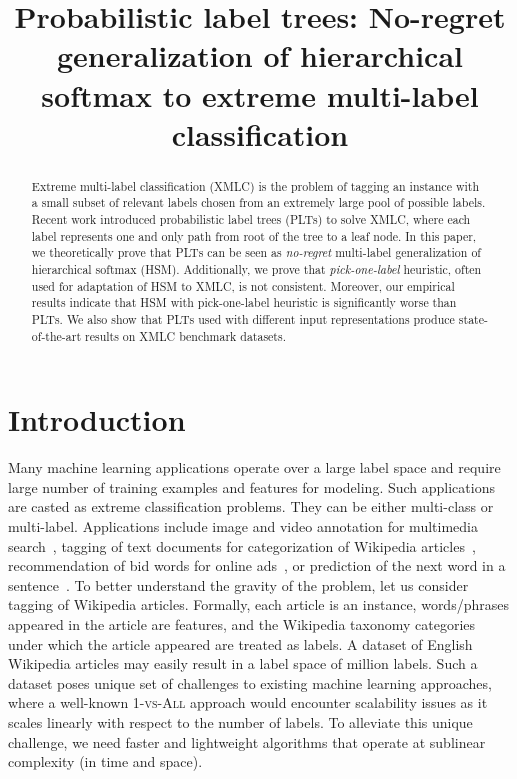 \documentclass{article}
\title{Probabilistic label trees: No-regret generalization of hierarchical softmax to extreme multi-label classification}
\newcommand{\Algo}[1]{\textsc{#1}}
\begin{document}
\maketitle



\begin{abstract}
Extreme multi-label classification (XMLC) is the problem of
tagging an instance with a small subset of relevant labels chosen from an
extremely large pool of possible labels.  
Recent work introduced probabilistic label trees
(\Algo{PLT}s) to solve XMLC, where each label represents one and only 
path from root of the tree to a leaf node.  In this paper, we
theoretically prove that \Algo{PLT}s can be seen as \emph{no-regret}
multi-label generalization of hierarchical softmax
(\Algo{HSM}). Additionally, we prove that \emph{pick-one-label}
heuristic, often used for adaptation of HSM to XMLC, is not consistent. 
Moreover, our
empirical results indicate that \Algo{HSM} with pick-one-label heuristic is
significantly worse than \Algo{PLT}s. We also show that \Algo{PLT}s used with
different input representations produce state-of-the-art results on XMLC benchmark
datasets.

%
\end{abstract}

\section{Introduction}
\label{sec:introduction}

Many machine learning applications operate over a large label space
and require large number of training examples and features for
modeling. Such applications are casted as extreme %
classification problems. They can be either multi-class or
multi-label. Applications include image and video
annotation for multimedia search~\citep{Deng_et_al_2011}, tagging of text documents for categorization of Wikipedia articles~\citep{Dekel_Shamir_2010}, recommendation of bid
words for online ads~\citep{Prabhu_Varma_2014}, or prediction of the
next word in a sentence~\citep{Mikolov_et_al_2013}.
%
To better understand the gravity of the problem, let us consider
tagging of Wikipedia articles. Formally, each article is an instance,
words/phrases appeared in the article are features, and the Wikipedia
taxonomy categories under which the article appeared are treated as
labels. A dataset of English Wikipedia articles may easily result in a
label space of million labels. Such a dataset poses unique set of
challenges to existing machine learning approaches, where a well-known
\Algo{1-vs-All} approach would encounter scalability issues as it
scales linearly with respect to the number of labels.  To alleviate this
unique challenge, we need faster and lightweight algorithms that
operate at sublinear complexity (in time and space).
\end{document}
